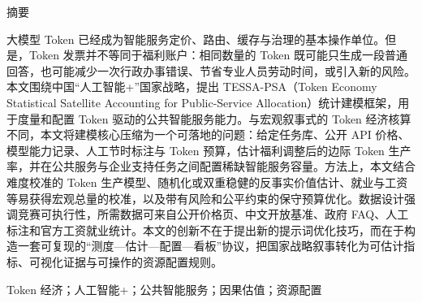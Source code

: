 \begin{center}
  {\heiti{} 摘要}
\end{center}
\vspace{0.5em}

\noindent
大模型 Token 已经成为智能服务定价、路由、缓存与治理的基本操作单位。但是，Token 发票并不等同于福利账户：相同数量的 Token 既可能只生成一段普通回答，也可能减少一次行政办事错误、节省专业人员劳动时间，或引入新的风险。本文围绕中国“人工智能+”国家战略，提出 TESSA-PSA（Token Economy Statistical Satellite Accounting for Public-Service Allocation）统计建模框架，用于度量和配置 Token 驱动的公共智能服务能力。与宏观叙事式的 Token 经济核算不同，本文将建模核心压缩为一个可落地的问题：给定任务库、公开 API 价格、模型能力记录、人工节时标注与 Token 预算，估计福利调整后的边际 Token 生产率，并在公共服务与企业支持任务之间配置稀缺智能服务容量。方法上，本文结合难度校准的 Token 生产模型、随机化或双重稳健的反事实价值估计、就业与工资等易获得宏观总量的校准，以及带有风险和公平约束的保守预算优化。数据设计强调竞赛可执行性，所需数据可来自公开价格页、中文开放基准、政府 FAQ、人工标注和官方工资就业统计。本文的创新不在于提出新的提示词优化技巧，而在于构造一套可复现的“测度—估计—配置—看板”协议，把国家战略叙事转化为可估计指标、可视化证据与可操作的资源配置规则。

\vspace{1em}
Token 经济；人工智能+；公共智能服务；因果估值；资源配置
